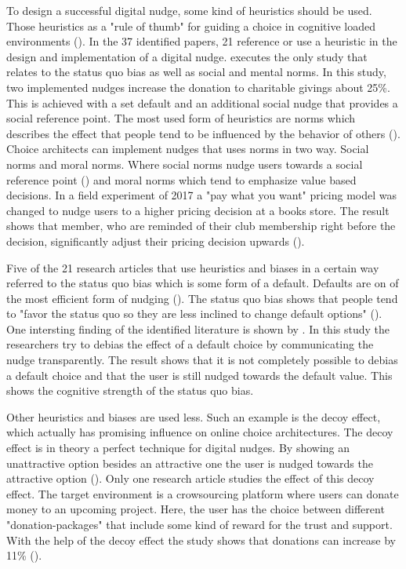 To design a successful digital nudge, some kind of heuristics should be used. Those heuristics as a "rule of thumb" for guiding a choice in cognitive loaded environments (\cite{thaler_nudge:_2009}). In the 37 identified papers, 21 reference or use a heuristic in the design and implementation of a digital nudge. \cite{zarghamee_nudging_2017} executes the only study that relates to the status quo bias as well as social and mental norms. In this study, two implemented nudges increase the donation to charitable givings about 25\%. This is achieved with a set default and an additional social nudge that provides a social reference point.
The most used form of heuristics are norms which describes the effect that people tend to be influenced by the behavior of others (\cite{schneider_digital_2018}). Choice architects can implement nudges that uses norms in two way. Social norms and moral norms. Where social norms nudge users towards a social reference point (\cite{wang_socially_2018}) and moral norms which tend to emphasize value based decisions. In a field experiment of 2017 a "pay what you want" pricing model was changed to nudge users to a higher pricing decision at a books store. The result shows that member, who are reminded of their club membership right before the decision, significantly adjust their pricing decision upwards (\cite{gravert_pride_2017}).

Five of the 21 research articles that use heuristics and biases in a certain way referred to the status quo bias which is some form of a default. Defaults are on of the most efficient form of nudging (\cite{johnson_defaults_2003}). The status quo bias shows that people tend to "favor the status quo so they are less inclined to change default options" (\cite{schneider_digital_2018}). One intersting finding of the identified literature is shown by \cite{steffel_ethically_2016}. In this study the researchers try to debias the effect of a default choice by communicating the nudge transparently. The result shows that it is not completely possible to debias a default choice and that the user is still nudged towards the default value. This shows the cognitive strength of the status quo bias.

Other heuristics and biases are used less. Such an example is the decoy effect, which actually has promising influence on online choice architectures. The decoy effect is in theory a perfect technique for digital nudges. By showing an unattractive option besides an attractive one the user is nudged towards the attractive option (\cite{schneider_digital_2018}). Only one research article studies the effect of this decoy effect. The target environment is a crowsourcing platform where users can donate money to an upcoming project. Here, the user has the choice between different "donation-packages" that include some kind of reward for the trust and support. With the help of the decoy effect the study shows that donations can increase by 11\% (\cite{tietz_decoy_2016}).

